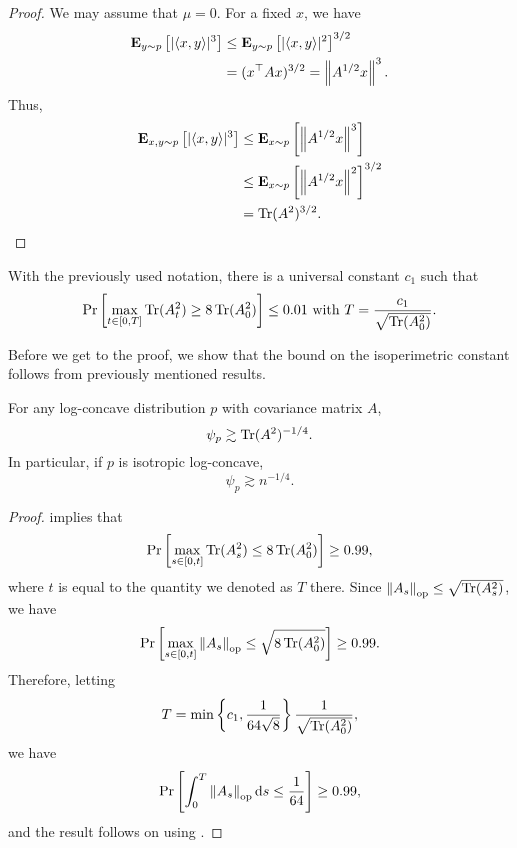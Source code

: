 		\begin{proof}
			We may assume that $\mu = 0$. For a fixed $x$, we have
			\begin{align*}
			 	\textbf{E}_{y\sim p}\left[ |\langle x,y\rangle|^3 \right] &\leq \textbf{E}_{y\sim p}\left[ |\langle x,y\rangle|^2 \right]^{3/2} \\
			 		&= (x^\top A x)^{3/2} = \left\lVert A^{1/2}x\right\rVert^3.
			 \end{align*} 
			 Thus,
			 \begin{align*}
			 	\textbf{E}_{x,y\sim p}\left[|\langle x,y\rangle|^3\right] &\leq \textbf{E}_{x \sim p} \left[ \left\lVert A^{1/2} x\right\rVert^3 \right] \\
			 		&\leq \textbf{E}_{x\sim p} \left[ \left\lVert A^{1/2}x\right\rVert^2 \right]^{3/2} \\
			 		&= \operatorname{Tr}(A^2)^{3/2}.
			 \end{align*}
		\end{proof}

		\begin{theorem}
			\label{lee-vem: growth theorem}
			With the previously used notation, there is a universal constant $c_1$ such that
			\[ \Pr\left[\max_{t \in [0,T]} \operatorname{Tr}(A_t^2) \geq 8 \operatorname{Tr}(A_0^2) \right] \leq 0.01 \text{ with } T = \frac{c_1}{\sqrt{\operatorname{Tr}(A_0^2)}}. \]
		\end{theorem}

		Before we get to the proof, we show that the bound on the isoperimetric constant follows from previously mentioned results.

		\begin{corollary}
			For any log-concave distribution $p$ with covariance matrix $A$,
			\[ \psi_p \gtrsim \operatorname{Tr}(A^2)^{-1/4}. \]
			In particular, if $p$ is isotropic log-concave,
			\[ \psi_p \gtrsim n^{-1/4}. \]
		\end{corollary}
		\begin{proof}
			 implies that
			\[ \Pr\left[\max_{s \in [0,t]} \operatorname{Tr}(A_s^2) \leq 8 \operatorname{Tr}(A_0^2)\right] \geq 0.99, \]
			where $t$ is equal to the quantity we denoted as $T$ there. Since $\left\lVert A_s\right\rVert_{\text{op}} \leq \sqrt{\operatorname{Tr}(A_s^2)}$, we have
			\[ \Pr\left[\max_{s \in [0,t]} \left\lVert A_s\right\rVert_{\text{op}} \leq \sqrt{8 \operatorname{Tr}(A_0^2)}\right] \geq 0.99. \]
			Therefore, letting
			\[ T = \min\left\{c_1, \frac{1}{64\sqrt{8}}\right\} \frac{1}{\sqrt{\operatorname{Tr}(A_0^2)}}, \]
			we have
			\[ \Pr\left[\int_0^T \left\lVert A_s\right\rVert_{\text{op}}\operatorname{d}\!{s} \leq \frac{1}{64}\right] \geq 0.99, \]
			and the result follows on using .
		\end{proof}

